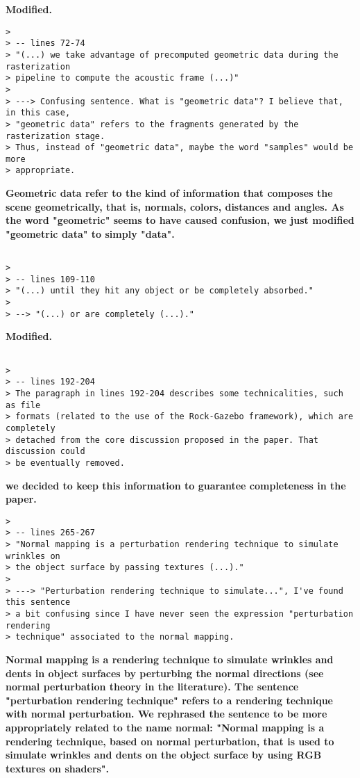 \documentclass{article}
\begin{document}
\textbf{Modified.}

\begin{verbatim}
>
> -- lines 72-74
> "(...) we take advantage of precomputed geometric data during the rasterization
> pipeline to compute the acoustic frame (...)"
>
> ---> Confusing sentence. What is "geometric data"? I believe that, in this case,
> "geometric data" refers to the fragments generated by the rasterization stage.
> Thus, instead of "geometric data", maybe the word "samples" would be more
> appropriate.
\end{verbatim}

\textbf{Geometric data refer to the kind of information that composes the scene geometrically, that is, normals, colors, distances and angles. As the word "geometric" seems to have caused confusion, we just modified "geometric data" to simply "data".}

\begin{verbatim}

>
> -- lines 109-110
> "(...) until they hit any object or be completely absorbed."
>
> --> "(...) or are completely (...)."

\end{verbatim}

\textbf{Modified.}

\begin{verbatim}

>
> -- lines 192-204
> The paragraph in lines 192-204 describes some technicalities, such as file
> formats (related to the use of the Rock-Gazebo framework), which are completely
> detached from the core discussion proposed in the paper. That discussion could
> be eventually removed.
\end{verbatim}

\textbf{we decided to keep this information to guarantee completeness in the paper.}

\begin{verbatim}
>
> -- lines 265-267
> "Normal mapping is a perturbation rendering technique to simulate wrinkles on
> the object surface by passing textures (...)."
>
> ---> "Perturbation rendering technique to simulate...", I've found this sentence
> a bit confusing since I have never seen the expression "perturbation rendering
> technique" associated to the normal mapping.
\end{verbatim}

\textbf{Normal mapping is a rendering technique to simulate wrinkles and dents in object surfaces by perturbing the normal directions (see normal perturbation theory in the literature). The sentence "perturbation rendering technique" refers to a rendering technique with normal perturbation. We rephrased the sentence to be more appropriately related to the name normal: "Normal mapping is a rendering technique, based on normal perturbation, that is used to simulate wrinkles and dents on the object surface by using RGB textures on shaders".}
\end{document}
